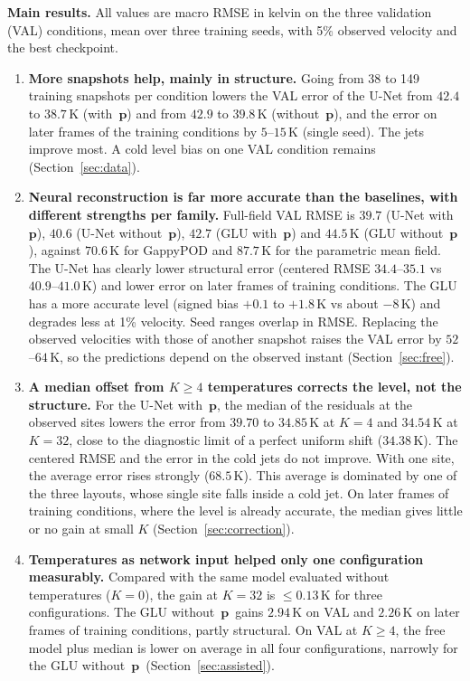 \documentclass[11pt,letterpaper]{article}
\newcommand{\K}{\,\mathrm{K}}
\newcommand{\pon}{with~$\mathbf{p}$}
\newcommand{\poff}{without~$\mathbf{p}$}
\begin{document}
\textbf{Main results.} All values are macro RMSE in kelvin on the three validation (VAL) conditions, mean over three training seeds, with 5\% observed velocity and the best checkpoint.
\begin{enumerate}
  \item \textbf{More snapshots help, mainly in structure.} Going from 38 to 149 training snapshots per condition lowers the VAL error of the U-Net from $42.4$ to $38.7\K$ (\pon) and from $42.9$ to $39.8\K$ (\poff), and the error on later frames of the training conditions by $5$--$15\K$ (single seed). The jets improve most. A cold level bias on one VAL condition remains (Section~\ref{sec:data}).
  \item \textbf{Neural reconstruction is far more accurate than the baselines, with different strengths per family.} Full-field VAL RMSE is $39.7$ (U-Net \pon), $40.6$ (U-Net \poff), $42.7$ (GLU \pon) and $44.5\K$ (GLU \poff), against $70.6\K$ for GappyPOD and $87.7\K$ for the parametric mean field. The U-Net has clearly lower structural error (centered RMSE $34.4$--$35.1$ vs $40.9$--$41.0\K$) and lower error on later frames of training conditions. The GLU has a more accurate level (signed bias $+0.1$ to $+1.8\K$ vs about $-8\K$) and degrades less at 1\% velocity. Seed ranges overlap in RMSE. Replacing the observed velocities with those of another snapshot raises the VAL error by $52$--$64\K$, so the predictions depend on the observed instant (Section~\ref{sec:free}).
  \item \textbf{A median offset from $K\ge4$ temperatures corrects the level, not the structure.} For the U-Net \pon, the median of the residuals at the observed sites lowers the error from $39.70$ to $34.85\K$ at $K{=}4$ and $34.54\K$ at $K{=}32$, close to the diagnostic limit of a perfect uniform shift ($34.38\K$). The centered RMSE and the error in the cold jets do not improve. With one site, the average error rises strongly ($68.5\K$). This average is dominated by one of the three layouts, whose single site falls inside a cold jet. On later frames of training conditions, where the level is already accurate, the median gives little or no gain at small $K$ (Section~\ref{sec:correction}).
  \item \textbf{Temperatures as network input helped only one configuration measurably.} Compared with the same model evaluated without temperatures ($K{=}0$), the gain at $K{=}32$ is $\le0.13\K$ for three configurations. The GLU \poff\ gains $2.94\K$ on VAL and $2.26\K$ on later frames of training conditions, partly structural. On VAL at $K\ge4$, the free model plus median is lower on average in all four configurations, narrowly for the GLU \poff\ (Section~\ref{sec:assisted}).
\end{enumerate}
\end{document}
